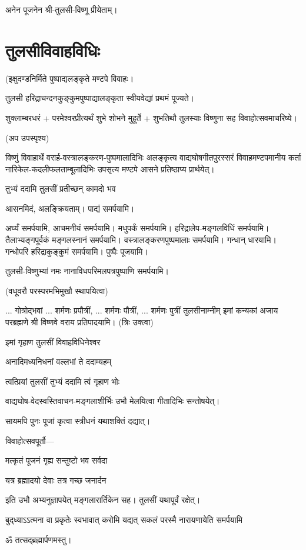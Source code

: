 अनेन पूजनेन श्री-तुलसी-विष्णू प्रीयेताम्। \\


\section{तुलसीविवाहविधिः}

(इक्षुदण्डनिर्मिते पुष्पाद्यलङ्कृते मण्टपे विवाहः।

तुलसी हरिद्राचन्दनकुङ्कुमपुष्पाद्यालङ्कृता स्वीयवेद्यां प्रथमं पूज्यते।

शुक्लाम्बरधरं + परमेश्वरप्रीत्यर्थं शुभे शोभने मुहूर्ते + शुभतिथौ तुलस्याः विष्णुना सह विवाहोत्सवमाचरिष्ये।

(अप उपस्पृश्य)

विष्णुं विवाहार्थे वरार्ह-वस्त्रालङ्करण-पुष्पमालादिभिः अलङ्कृत्य वाद्यघोषगीतपुरस्सरं विवाहमण्टपमानीय कर्ता नारिकेल-कदलीफलताम्बूलादिभिः उपसृत्य मण्टपे आसने प्रतिष्ठाप्य प्रार्थयेत्।

{तुभ्यं ददामि तुलसीं प्रतीच्छन् कामदो भव}


आसनमिदं, अलङ्क्रियताम्।
पाद्यं समर्पयामि।

अर्घ्यं समर्पयामि, आचमनीयं समर्पयामि।
मधुपर्कं समर्पयामि।
हरिद्रालेप-मङ्गलविधिं समर्पयामि।
तैलाभ्यङ्गपूर्वकं मङ्गलस्नानं समर्पयामि।
वस्त्रालङ्करणपुष्पमालाः समर्पयामि।
गन्धान् धारयामि। गन्धोपरि हरिद्राकुङ्कुमं समर्पयामि।
पुष्पैः पूजयामि।

तुलसी-विष्णुभ्यां नमः नानाविधपरिमलपत्रपुष्पाणि समर्पयामि।

(वधूवरौ परस्परमभिमुखौ स्थापयित्वा)

... गोत्रोद्भवां ... शर्मणः प्रपौत्रीं, ... शर्मणः पौत्रीं, ... शर्मणः पुत्रीं 
तुलसीनाम्नीम् इमां कन्यकां अजाय 
परब्रह्मणे श्री विष्णवे वराय प्रतिपादयामि। (त्रिः उक्त्वा) 

{इमां गृहाण तुलसीं विवाहविधिनेश्वर}

{अनादिमध्यनिधनां वल्लभां ते ददाम्यहम्}

{त्वत्प्रियां तुलसीं तुभ्यं ददामि त्वं गृहाण भोः}

वाद्यघोष-वेदस्वस्तिवाचन-मङ्गलाशीर्भिः उभौ मेलयित्वा गीतादिभिः सन्तोषयेत्।

सायमपि पुनः पूजां कृत्वा स्त्रीधनं यथाशक्तिं दद्यात्।

विवाहोत्सवपूर्तौ\textsf{---}\hfill\mbox{}

{मत्कृतं पूजनं गृह्य सन्तुष्टो भव सर्वदा}

{यत्र ब्रह्मादयो देवाः तत्र गच्छ जनार्दन}



इति उभौ अभ्यनुज्ञापयेत् मङ्गलारार्तिकेन सह। तुलसीं यथापूर्वं रक्षेत्।

{बुद्‌ध्याऽऽत्मना वा प्रकृतेः स्वभावात्}
{करोमि यद्यत् सकलं परस्मै}
{नारायणायेति समर्पयामि}

ॐ तत्सद्ब्रह्मार्पणमस्तु।

\closesection